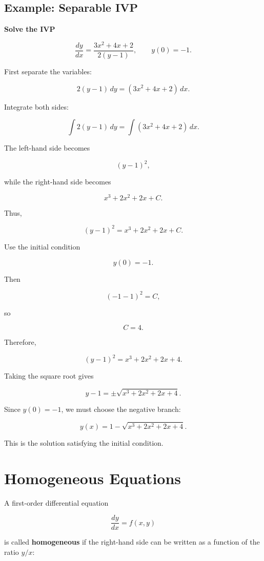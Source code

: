 \documentclass[11pt]{article}
\begin{document}
\subsection{Example: Separable IVP}

\textbf{Solve the IVP}

\[
\frac{dy}{dx}
=
\frac{3x^2+4x+2}{2(y-1)},
\qquad
y(0)=-1.
\]

First separate the variables:

\[
2(y-1)\,dy
=
(3x^2+4x+2)\,dx.
\]

Integrate both sides:

\[
\int 2(y-1)\,dy
=
\int(3x^2+4x+2)\,dx.
\]

The left-hand side becomes

\[
(y-1)^2,
\]

while the right-hand side becomes

\[
x^3+2x^2+2x+C.
\]

Thus,

\[
(y-1)^2
=
x^3+2x^2+2x+C.
\]

Use the initial condition

\[
y(0)=-1.
\]

Then

\[
(-1-1)^2=C,
\]

so

\[
C=4.
\]

Therefore,

\[
(y-1)^2
=
x^3+2x^2+2x+4.
\]

Taking the square root gives

\[
y-1
=
\pm
\sqrt{x^3+2x^2+2x+4}.
\]

Since $y(0)=-1$, we must choose the negative branch:

\[
\boxed{
y(x)
=
1-
\sqrt{x^3+2x^2+2x+4}
}.
\]

This is the solution satisfying the initial condition.

\section{Homogeneous Equations}

A first-order differential equation

\[
\frac{dy}{dx}=f(x,y)
\]

is called \textbf{homogeneous} if the right-hand side can be
written as a function of the ratio $y/x$:
\end{document}
